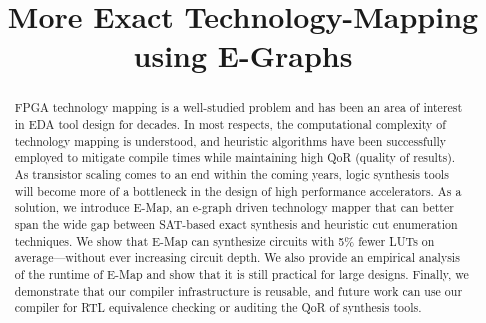 \documentclass[sigplan,nonacm]{acmart}
\newcommand{\fullname}{More Exact Technology-Mapping using E-Graphs}
\begin{document}
\title{\fullname}

\begin{abstract}
    FPGA technology mapping is a well-studied problem and has been an area of
    interest in EDA tool design for decades. In most respects, the computational
    complexity of technology mapping is understood, and heuristic algorithms have
    been successfully employed to mitigate compile times while maintaining high QoR
    (quality of results). As transistor scaling comes to an end within the coming
    years, logic synthesis tools will become more of a bottleneck in the design of
    high performance accelerators. As a solution, we introduce E-Map, an e-graph
    driven technology mapper that can better span the wide gap between SAT-based
    exact synthesis and heuristic cut enumeration techniques. We show that E-Map
    can synthesize circuits with 5\% fewer LUTs on average---without ever
    increasing circuit depth. We also provide an empirical analysis of the runtime
    of E-Map and show that it is still practical for large designs. Finally, we
    demonstrate that our compiler infrastructure is reusable, and future work can
    use our compiler for RTL equivalence checking or auditing the QoR of synthesis
    tools.
\end{abstract}
\maketitle %










\end{document}
